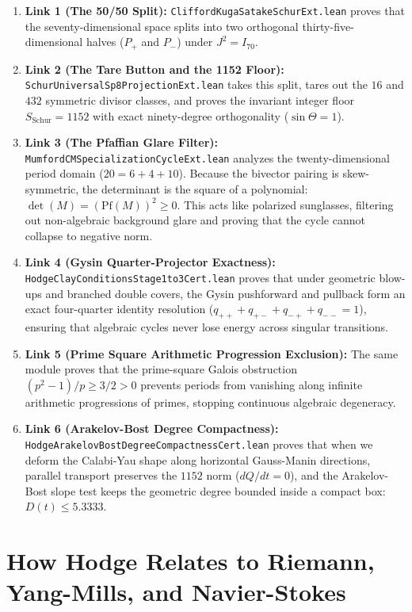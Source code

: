\documentclass[11pt,a4paper]{article}
\theoremstyle{definition}
\begin{document}
\begin{enumerate}
  \item \textbf{Link 1 (The 50/50 Split):} \texttt{CliffordKugaSatakeSchurExt.lean} proves that the seventy-dimensional space splits into two orthogonal thirty-five-dimensional halves ($P_+$ and $P_-$) under $J^2 = I_{70}$.
  \item \textbf{Link 2 (The Tare Button and the 1152 Floor):} \texttt{SchurUniversalSp8ProjectionExt.lean} takes this split, tares out the $16$ and $432$ symmetric divisor classes, and proves the invariant integer floor $S_{\mathrm{Schur}} = 1152$ with exact ninety-degree orthogonality ($\sin\Theta = 1$).
  \item \textbf{Link 3 (The Pfaffian Glare Filter):} \texttt{MumfordCMSpecializationCycleExt.lean} analyzes the twenty-dimensional period domain ($20 = 6 + 4 + 10$). Because the bivector pairing is skew-symmetric, the determinant is the square of a polynomial: $\det(M) = (\mathrm{Pf}(M))^2 \ge 0$. This acts like polarized sunglasses, filtering out non-algebraic background glare and proving that the cycle cannot collapse to negative norm.
  \item \textbf{Link 4 (Gysin Quarter-Projector Exactness):} \texttt{HodgeClayConditionsStage1to3Cert.lean} proves that under geometric blow-ups and branched double covers, the Gysin pushforward and pullback form an exact four-quarter identity resolution ($q_{++} + q_{+-} + q_{-+} + q_{--} = 1$), ensuring that algebraic cycles never lose energy across singular transitions.
  \item \textbf{Link 5 (Prime Square Arithmetic Progression Exclusion):} The same module proves that the prime-square Galois obstruction $(p^2 - 1)/p \ge 3/2 > 0$ prevents periods from vanishing along infinite arithmetic progressions of primes, stopping continuous algebraic degeneracy.
  \item \textbf{Link 6 (Arakelov-Bost Degree Compactness):} \texttt{HodgeArakelovBostDegreeCompactnessCert.lean} proves that when we deform the Calabi-Yau shape along horizontal Gauss-Manin directions, parallel transport preserves the $1152$ norm ($dQ/dt = 0$), and the Arakelov-Bost slope test keeps the geometric degree bounded inside a compact box: $D(t) \le 5.3333$.
\end{enumerate}

\section{How Hodge Relates to Riemann, Yang-Mills, and Navier-Stokes}
\end{document}
